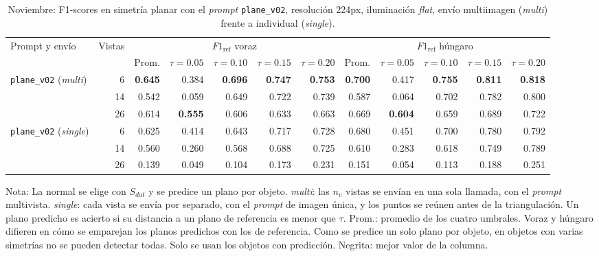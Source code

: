 \clearpage

\begin{table}[htbp]
\centering
\caption{Noviembre: F1-scores en simetría planar con el \textit{prompt} \texttt{plane\_v02}, resolución 224px, iluminación \textit{flat}, envío multiimagen (\textit{multi}) frente a individual (\textit{single}).}
\label{tab:nov_plane_v02_modo_envio_f1}
\begin{lrbox}{\tablebox}
\begin{adjustbox}{max width=\textwidth}
\begin{tabular}{lrrrrrrrrrrr}
\toprule
\multirow{2}{*}{Prompt y envío} & \multirow{2}{*}{Vistas} & \multicolumn{5}{c}{$F1_{\mathrm{ref}}$ voraz} & \multicolumn{5}{c}{$F1_{\mathrm{ref}}$ húngaro} \\
\cmidrule(lr){3-7} \cmidrule(lr){8-12}
 &  & Prom. & $\tau{=}0.05$ & $\tau{=}0.10$ & $\tau{=}0.15$ & $\tau{=}0.20$ & Prom. & $\tau{=}0.05$ & $\tau{=}0.10$ & $\tau{=}0.15$ & $\tau{=}0.20$ \\
\midrule
\multirow{3}{*}{\texttt{plane\_v02} (\textit{multi})} & 6 & \textbf{0.645} & 0.384 & \textbf{0.696} & \textbf{0.747} & \textbf{0.753} & \textbf{0.700} & 0.417 & \textbf{0.755} & \textbf{0.811} & \textbf{0.818} \\
 & 14 & 0.542 & 0.059 & 0.649 & 0.722 & 0.739 & 0.587 & 0.064 & 0.702 & 0.782 & 0.800 \\
 & 26 & 0.614 & \textbf{0.555} & 0.606 & 0.633 & 0.663 & 0.669 & \textbf{0.604} & 0.659 & 0.689 & 0.722 \\
\midrule
\multirow{3}{*}{\texttt{plane\_v02} (\textit{single})} & 6 & 0.625 & 0.414 & 0.643 & 0.717 & 0.728 & 0.680 & 0.451 & 0.700 & 0.780 & 0.792 \\
 & 14 & 0.560 & 0.260 & 0.568 & 0.688 & 0.725 & 0.610 & 0.283 & 0.618 & 0.749 & 0.789 \\
 & 26 & 0.139 & 0.049 & 0.104 & 0.173 & 0.231 & 0.151 & 0.054 & 0.113 & 0.188 & 0.251 \\
\bottomrule
\end{tabular}
\end{adjustbox}
\end{lrbox}
\usebox{\tablebox}

\vspace{1.5ex}
\begin{minipage}{\wd\tablebox}
\footnotesize
Nota: La normal se elige con $S_{dat}$ y se predice un plano por objeto. \textit{multi}: las $n_v$ vistas se envían en una sola llamada, con el \textit{prompt} multivista. \textit{single}: cada vista se envía por separado, con el \textit{prompt} de imagen única, y los puntos se reúnen antes de la triangulación. Un plano predicho es acierto si su distancia a un plano de referencia es menor que $\tau$. Prom.: promedio de los cuatro umbrales. Voraz y húngaro difieren en cómo se emparejan los planos predichos con los de referencia. Como se predice un solo plano por objeto, en objetos con varias simetrías no se pueden detectar todas. Solo se usan los objetos con predicción. Negrita: mejor valor de la columna.
\end{minipage}
\end{table}

